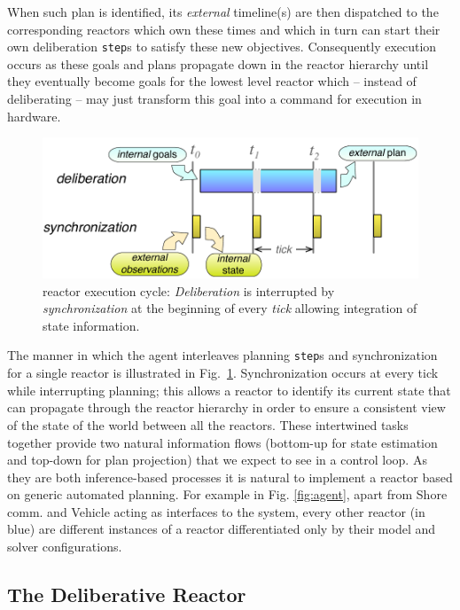  When such plan is identified, its {\em external}
timeline(s) are then dispatched to the corresponding reactors which
own these times and which in turn can start their own deliberation
\texttt{step}s to satisfy these new objectives. Consequently execution
occurs as these goals and plans propagate down in the reactor
hierarchy until they eventually become goals for the lowest level
reactor which -- instead of deliberating -- may just transform this
goal into a command for execution in hardware.

\begin{figure}[!htbp]
  \centering
  \vskip-1pc
  \includegraphics[width=0.55\columnwidth]{figs/tick-cycle}
  \caption{\small \rx reactor execution cycle: {\em Deliberation} is
    interrupted by {\em synchronization} at the beginning of every
    {\em tick} allowing integration of state information.}
  \label{fig:tick-exec}
  \vskip-0.8pc
\end{figure}

The manner in which the agent interleaves planning \texttt{step}s and
synchronization for a single reactor is illustrated in
Fig.~\ref{fig:tick-exec}. Synchronization occurs at every tick while
interrupting planning; this allows a reactor to identify its current
state that can propagate through the reactor hierarchy in order to
ensure a consistent view of the state of the world between all the
reactors.
These intertwined tasks together provide two natural information flows
(bottom-up for state estimation and top-down for plan projection) that
we expect to see in a control loop. As they are both inference-based
processes it is natural to implement a reactor based on generic
automated planning. For example in Fig. \ref{fig:agent}, apart from
\textsf{Shore comm.} and \textsf{Vehicle} acting as interfaces to the
system, every other reactor (in blue) are different instances of a \eu
reactor differentiated only by their model and \eu solver
configurations.

\subsection{The  \eu Deliberative Reactor}
\label{sec:arch:europa}

